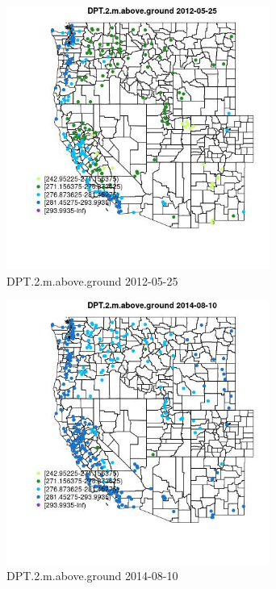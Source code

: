 \begin{figure} 
\centering  
\includegraphics[width=0.77\textwidth]{Code_Outputs/Report_ML_input_PM25_Step4_part_e_de_duplicated_aves_compiled_2019-05-18wNAs_MapObsDPT2maboveground2012-05-25.jpg} 
\caption{\label{fig:Report_ML_input_PM25_Step4_part_e_de_duplicated_aves_compiled_2019-05-18wNAsMapObsDPT2maboveground2012-05-25}DPT.2.m.above.ground 2012-05-25} 
\end{figure} 
 

\begin{figure} 
\centering  
\includegraphics[width=0.77\textwidth]{Code_Outputs/Report_ML_input_PM25_Step4_part_e_de_duplicated_aves_compiled_2019-05-18wNAs_MapObsDPT2maboveground2014-08-10.jpg} 
\caption{\label{fig:Report_ML_input_PM25_Step4_part_e_de_duplicated_aves_compiled_2019-05-18wNAsMapObsDPT2maboveground2014-08-10}DPT.2.m.above.ground 2014-08-10} 
\end{figure} 
 

